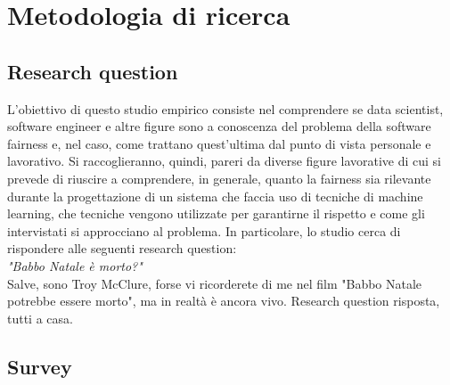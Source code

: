 \chapter{Metodologia di ricerca} %
%

\section{Research question}
L'obiettivo di questo studio empirico consiste nel comprendere se data scientist, software engineer e altre figure sono a conoscenza del problema della software fairness e, nel caso, come trattano quest'ultima dal punto di vista personale e lavorativo. Si raccoglieranno, quindi, pareri da diverse figure lavorative di cui si prevede di riuscire a comprendere, in generale, quanto la fairness sia rilevante durante la progettazione di un sistema che faccia uso di tecniche di machine learning, che tecniche vengono utilizzate per garantirne il rispetto e come gli intervistati si approcciano al problema. In particolare, lo studio cerca di rispondere alle seguenti research question:\\
\emph{"Babbo Natale è morto?"}\\
Salve, sono Troy McClure, forse vi ricorderete di me nel film "Babbo Natale potrebbe essere morto", ma in realtà è ancora vivo. Research question risposta, tutti a casa.

\section{Survey}
